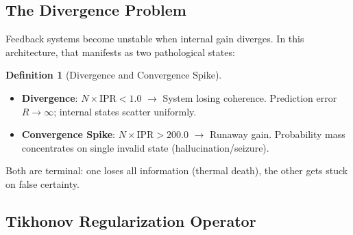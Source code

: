 \documentclass[11pt,oneside]{article}
\theoremstyle{definition}
\newtheorem{definition}[theorem]{Definition}
\begin{document}
\subsection{The Divergence Problem}

Feedback systems become unstable when internal gain diverges. In this architecture, that manifests as two pathological states:

\begin{definition}[Divergence and Convergence Spike]
\begin{itemize}
  \item \textbf{Divergence}: $N \times \text{IPR} < 1.0$ \ensuremath{\rightarrow} System losing coherence. Prediction error $R \to \infty$; internal states scatter uniformly.
  \item \textbf{Convergence Spike}: $N \times \text{IPR} > 200.0$ \ensuremath{\rightarrow} Runaway gain. Probability mass concentrates on single invalid state (hallucination/seizure).
\end{itemize}
\end{definition}

Both are terminal: one loses all information (thermal death), the other gets stuck on false certainty.

\subsection{Tikhonov Regularization Operator}
\end{document}

